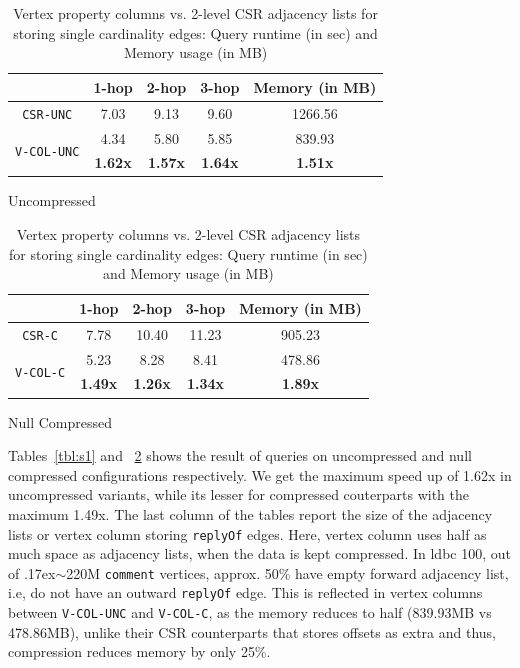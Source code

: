 \begin{table}
	\centering
	\begin{subtable}{1\textwidth}
		\centering
		\bgroup
		\setlength{\tabcolsep}{8pt}
		\def\arraystretch{1.2}%
		\begin{tabular}{ |c|c|c|c|c| }
			\hline
			& \textbf{1-hop} & \textbf{2-hop} & \textbf{3-hop} & \textbf{Memory (in MB)} \\ 
			\hline \hline
			\texttt{CSR-UNC}& 7.03 & 9.13 & 9.60 & 1266.56 \\ 
			\hline
			\multirow{2}{*}{\texttt{V-COL-UNC}}& 4.34 & 5.80 & 5.85 & 839.93 \\ 
			& \textbf{1.62x} & \textbf{1.57x} & \textbf{1.64x} & \textbf{1.51x} \\ 
			\hline
		\end{tabular}
		\egroup
		\captionsetup{justification=centering}
		\caption{Uncompressed}
		\label{tbl:s1}
	\end{subtable}
	\begin{subtable}{1\textwidth}
		\centering
		\bgroup
		\setlength{\tabcolsep}{8pt}
		\def\arraystretch{1.2}
		\begin{tabular}{ |c|c|c|c|c| } 
			\hline
			& \textbf{1-hop} & \textbf{2-hop} & \textbf{3-hop} & \textbf{Memory (in MB)} \\ 
			\hline \hline
			\texttt{CSR-C}& 7.78 & 10.40 & 11.23 & 905.23 \\ 
			\hline
			\multirow{2}{*}{\texttt{V-COL-C}}& 5.23 & 8.28 & 8.41 & 478.86 \\ 
			& \textbf{1.49x} & \textbf{1.26x} & \textbf{1.34x} & \textbf{1.89x} \\ 
			\hline
		\end{tabular}
		\egroup
		\captionsetup{justification=centering}
		\caption{Null Compressed}
		\label{tbl:s2}
	\end{subtable}
	\captionsetup{justification=centering}
	\caption{Vertex property columns vs. 2-level CSR adjacency lists for storing single cardinality edges: Query runtime (in sec) and Memory usage (in MB)  }
\end{table}

Tables~\ref{tbl:s1} and ~\ref{tbl:s2} shows the result of queries on uncompressed and null compressed configurations respectively. 	We get the maximum speed up of 1.62x in uncompressed variants, while its lesser for compressed couterparts with the maximum 1.49x. The last column of the tables report the size of the adjacency lists or vertex column storing \texttt{replyOf} edges. Here, vertex column uses half as much space as adjacency lists, when the data is kept compressed. In \gls{ldbc} 100, out of {\raise.17ex\hbox{$\scriptstyle\sim$}}220M \texttt{comment} vertices, approx. 50\% have empty forward adjacency list, i.e, do not have an outward \texttt{replyOf} edge. This is reflected in vertex columns between \texttt{V-COL-UNC} and \texttt{V-COL-C}, as the memory reduces to half (839.93MB vs 478.86MB), unlike their CSR counterparts that stores offsets as extra and thus, compression reduces memory by only 25\%.

